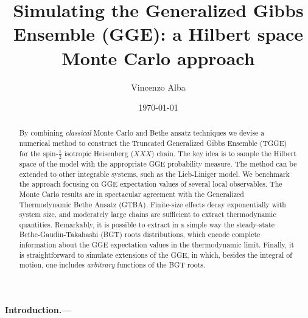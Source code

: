 \documentclass[twocolumn,superscriptaddress,prb,10pt]{revtex4-1}
\begin{document}
\title{Simulating the Generalized Gibbs Ensemble (GGE): a Hilbert space 
Monte Carlo approach} 

\author{Vincenzo Alba}

\date{\today}




\begin{abstract} 

By combining {\it classical} Monte Carlo and Bethe ansatz techniques we devise a numerical 
method to construct the Truncated Generalized Gibbs Ensemble (TGGE) for the spin-$\frac{1}{2}$ 
isotropic Heisenberg ($XXX$) chain. The key idea is to sample the Hilbert space of the model 
with the appropriate GGE probability measure. The method can be extended to other integrable 
systems, such as the Lieb-Liniger model. We benchmark the approach focusing on 
GGE expectation values of several local observables. The Monte Carlo results are in spectacular 
agreement with the Generalized Thermodynamic Bethe Ansatz (GTBA). Finite-size effects decay 
exponentially with system size, and moderately large chains are sufficient to extract thermodynamic 
quantities. Remarkably, it is possible to extract in a simple way the steady-state Bethe-Gaudin-Takahashi 
(BGT) roots distributions, which encode complete information about the GGE expectation values in 
the thermodynamic limit. Finally, it is straightforward to simulate extensions of the GGE, in which, 
besides the integral of motion, one includes {\it arbitrary} functions of the BGT roots. 


\end{abstract}


\maketitle


\paragraph*{Introduction.---}
\end{document}
